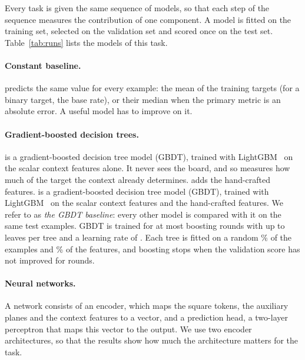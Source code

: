 Every task is given the same sequence of models, so that each step of the
sequence measures the contribution of one component. A model is fitted on the
training set, selected on the validation set and scored once on the test set.
Table~\ref{tab:runs} lists the models of this task.

\paragraph{Constant baseline.}
 predicts the same value for every example: the mean of the
training targets (for a binary target, the base rate), or their median when
the primary metric is an absolute error. A useful model has to improve on it.

\paragraph{Gradient-boosted decision trees.}
\ifcontextgbdt
{} is a gradient-boosted decision tree model (GBDT), trained
with LightGBM~\cite{lightgbm} on the scalar context features alone. It never
sees the board, and so measures how much of the target the context already
determines.  adds the hand-crafted features.
\else
{} is a gradient-boosted decision tree model (GBDT), trained with
LightGBM~\cite{lightgbm} on the scalar context features and the hand-crafted
features.
\fi
We refer to  as \emph{the GBDT baseline}: every other model is
compared with it on the same test examples. GBDT is trained for at most
 boosting rounds with up to  leaves
per tree and a learning rate of . Each tree is fitted on a
random \% of the examples and
\% of the features, and boosting stops when the
validation score has not improved for  rounds.

\paragraph{Neural networks.}
A network consists of an encoder, which maps the square tokens, the auxiliary
planes and the context features to a vector, and a prediction head, a
two-layer perceptron that maps this vector to the output. We use two encoder
architectures, so that the results show how much the architecture matters for
the task.

